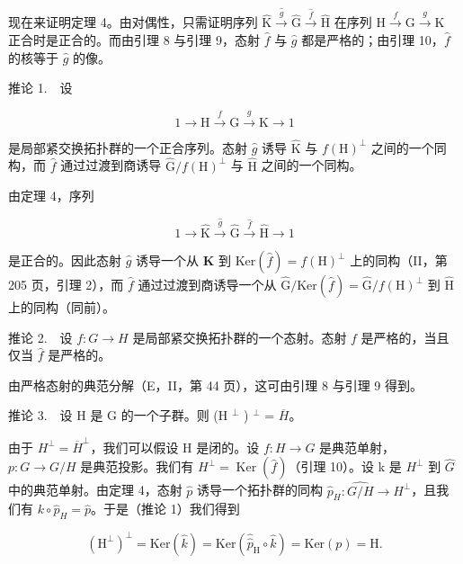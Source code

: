 现在来证明定理 4。由对偶性，只需证明序列 \(\widehat{\mathrm{K}}\xrightarrow{\widehat{g}}\widehat{\mathrm{G}}\xrightarrow{\widehat{f}}\widehat{\mathrm{H}}\) 在序列 \(\mathrm{H}\xrightarrow{f}\mathrm{G}\xrightarrow{g}\mathrm{K}\) 正合时是正合的。而由引理 8 与引理 9，态射 \(\widehat{f}\) 与 \(\widehat{g}\) 都是严格的；由引理 10，\(\widehat{f}\) 的核等于 \(\widehat{g}\) 的像。

推论 1.　设

\[
1 \to \mathrm{H} \xrightarrow {f} \mathrm{G} \xrightarrow {g} \mathrm{K} \to 1
\]

是局部紧交换拓扑群的一个正合序列。态射 \(\widehat{g}\) 诱导 \(\widehat{\mathrm{K}}\) 与 \(f(\mathrm{H})^{\perp}\) 之间的一个同构，而 \(\widehat{f}\) 通过过渡到商诱导 \(\widehat{\mathrm{G}} / f(\mathrm{H})^{\perp}\) 与 \(\widehat{\mathrm{H}}\) 之间的一个同构。

由定理 4，序列

\[
1 \to \widehat {\mathrm{K}} \xrightarrow {\widehat {g}} \widehat {\mathrm{G}} \xrightarrow {\widehat {f}} \widehat {\mathrm{H}} \to 1\tag{32}
\]

是正合的。因此态射 \(\widehat{g}\) 诱导一个从 \(\widehat{\mathbf{K}}\) 到 \(\mathrm{Ker}(\widehat{f}) = f(\mathrm{H})^{\perp}\) 上的同构（II，第 205 页，引理 2），而 \(\widehat{f}\) 通过过渡到商诱导一个从 \(\widehat{\mathrm{G}} / \mathrm{Ker}(\widehat{f}) = \widehat{\mathrm{G}} / f(\mathrm{H})^{\perp}\) 到 \(\widehat{\mathrm{H}}\) 上的同构（同前）。

推论 2.　设 \(f\colon G\to H\) 是局部紧交换拓扑群的一个态射。态射 \(f\) 是严格的，当且仅当 \(\widehat{f}\) 是严格的。

由严格态射的典范分解（E，II，第 44 页），这可由引理 8 与引理 9 得到。

推论 3.　设 H 是 G 的一个子群。则 (H \(^{\perp}\) ) \(^{\perp}\) = \(\overline{H}\)。

由于 \(H^{\perp} = \overline{H}^{\perp}\)，我们可以假设 H 是闭的。设 \(f: H \to G\) 是典范单射，\(p: G \to G/H\) 是典范投影。我们有 \(H^{\perp} = \operatorname{Ker}(\widehat{f})\)（引理 10）。设 k 是 \(H^{\perp}\) 到 \(\widehat{G}\) 中的典范单射。由定理 4，态射 \(\widehat{p}\) 诱导一个拓扑群的同构 \(\widehat{p}_{H}: \widehat{G/H} \to H^{\perp}\)，且我们有 \(k \circ \widehat{p}_{H} = \widehat{p}\)。于是（推论 1）我们得到

\[
(\mathrm{H} ^ {\perp}) ^ {\perp} = \mathrm{Ker} (\widehat {k}) = \mathrm{Ker} (\widehat {\widehat {p}} _ {\mathrm{H}} \circ \widehat {k}) = \mathrm{Ker} (p) = \mathrm{H}.
\]

